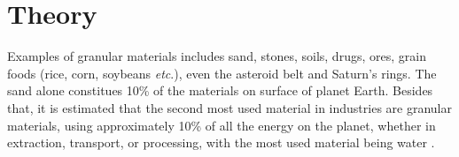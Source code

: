     

\section{Theory}
\label{subsection:Teoria}


    Examples of granular materials includes sand, stones, soils, drugs, ores, grain foods (rice, corn, soybeans \textit{etc}.), even the asteroid belt and Saturn's rings. The sand alone constitues 10\% of the materials on surface of planet Earth. Besides that, it is estimated that the second most used material in industries are granular materials, using approximately 10\% of all the energy on the planet, whether in extraction, transport, or processing, with the most used material being water \cite{Sands_Powders_and_Grains}.

